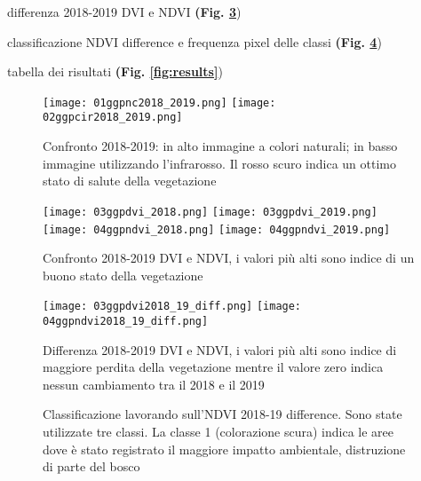\documentclass[a4paper,12pt]{article}
\begin{document}
differenza 2018-2019 DVI e NDVI \textbf{(Fig. \ref{fig:dvi_ndvi_diff2018_19}})

classificazione NDVI difference e frequenza pixel delle classi \textbf{(Fig. \ref{fig:ndvi_diff_class}})

tabella dei risultati \textbf{(Fig. \ref{fig:results}})

\begin{figure}
\centering
    \texttt{[image: 01ggpnc2018\_2019.png]}
    \texttt{[image: 02ggpcir2018\_2019.png]}
    \caption{Confronto 2018-2019: in alto immagine a colori naturali; in basso immagine utilizzando l'infrarosso. Il rosso scuro indica un ottimo stato di salute della vegetazione}
    \label{fig:nc_cir2018_2019}
\end{figure}

\begin{figure}
\centering
    \texttt{[image: 03ggpdvi\_2018.png]}
    \texttt{[image: 03ggpdvi\_2019.png]} \\
    \texttt{[image: 04ggpndvi\_2018.png]}
    \texttt{[image: 04ggpndvi\_2019.png]}
    \caption{Confronto 2018-2019 DVI e NDVI, i valori più alti sono indice di un buono stato della vegetazione}
    \label{fig:dvi_ndvi2018_19}
\end{figure}

\begin{figure}
\centering
    \texttt{[image: 03ggpdvi2018\_19\_diff.png]}
    \texttt{[image: 04ggpndvi2018\_19\_diff.png]}
    \caption{Differenza 2018-2019 DVI e NDVI, i valori più alti sono indice di maggiore perdita della vegetazione mentre il valore zero indica nessun cambiamento tra il 2018 e il 2019}
    \label{fig:dvi_ndvi_diff2018_19}
\end{figure}

\begin{figure}
\centering
    \setlength{\fboxsep}{0pt}%
    \setlength{\fboxrule}{1pt}%
    \caption{Classificazione lavorando sull'NDVI 2018-19 difference. Sono state utilizzate tre classi. La classe 1 (colorazione scura) indica le aree dove è stato registrato il maggiore impatto ambientale, distruzione di parte del bosco}
    \label{fig:ndvi_diff_class}
\end{figure}
\end{document}
